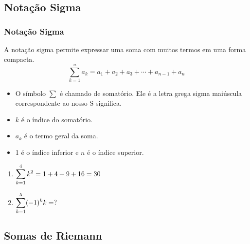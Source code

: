
\subsection*{Notação Sigma}


\begin{frame}[label=def_integral]
\frametitle{Notação Sigma }
\begin{small}
\noindent A notação sigma permite expressar uma soma com muitos termos em uma forma compacta.
$$\sum_{k=1}^na_k=a_1+a_2+a_3+\cdots+a_{n-1}+a_n$$

\begin{itemize}
\item O símbolo $\sum$ é chamado de somatório. Ele é a letra grega sigma maiúscula correspondente ao nosso S significa.

\item $k$ é o índice do somatório.

\item $a_k$ é o termo geral da soma.

\item 1 é o índice inferior e $n$ é o índice superior.

\end{itemize}

\end{small}

\end{frame}



\begin{frame}[label=def_integral]
\begin{exe}
\begin{enumerate}
\item $\displaystyle\sum_{k=1}^4k^2=1+4+9+16=30$
\item $\displaystyle\sum_{k=1}^5(-1)^k k=?$
\end{enumerate}
\end{exe}

\end{frame}

\subsection*{Somas de Riemann}

